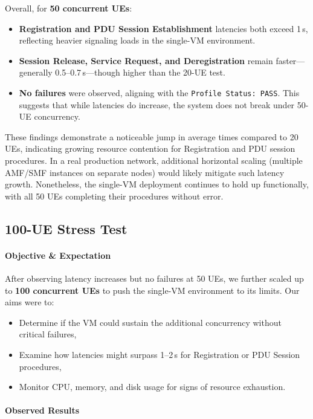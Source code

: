 Overall, for \textbf{50 concurrent UEs}:
\begin{itemize}
    \item \textbf{Registration and PDU Session Establishment} latencies both exceed 1\,s, reflecting heavier signaling loads in the single-VM environment.
    \item \textbf{Session Release, Service Request, and Deregistration} remain faster—generally 0.5--0.7\,s—though higher than the 20-UE test.
    \item \textbf{No failures} were observed, aligning with the \texttt{Profile Status: PASS}. This suggests that while latencies do increase, the system does not break under 50-UE concurrency.
\end{itemize}

These findings demonstrate a noticeable jump in average times compared to 20 UEs, indicating growing resource contention for Registration and PDU session procedures. In a real production network, additional horizontal scaling (multiple AMF/SMF instances on separate nodes) would likely mitigate such latency growth. Nonetheless, the single-VM deployment continues to hold up functionally, with all 50 UEs completing their procedures without error.

\subsection{100-UE Stress Test}
\label{sssec:100UE-stress-test}

\paragraph{Objective \& Expectation}
After observing latency increases but no failures at 50 UEs, we further scaled up to \textbf{100 concurrent UEs} to push the single-VM environment to its limits. Our aims were to:
\begin{itemize}
  \item Determine if the VM could sustain the additional concurrency without critical failures,
  \item Examine how latencies might surpass 1--2\,s for Registration or PDU Session procedures,
  \item Monitor CPU, memory, and disk usage for signs of resource exhaustion.
\end{itemize}

\paragraph{Observed Results}

